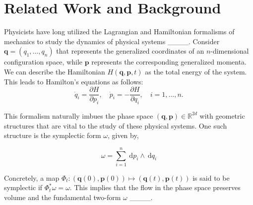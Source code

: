 \section{Related Work and Background}
\label{relatedwork}

Physicists have long utilized the Lagrangian and Hamiltonian formalisms of mechanics to study the dynamics of physical systems ____. Consider $\mathbf q=\left(q_1, \ldots, q_n\right)$ that represents the generalized coordinates of an $n$-dimensional configuration space, while ${\mathbf p}$ represents the corresponding generalized momenta. We can describe the Hamiltonian $H(\mathbf q, \mathbf p, t)$ as the total energy of the system. This leads to Hamilton's equations as follows:
\begin{equation}
    \dot{q}_i=\frac{\partial H}{\partial p_i}, \quad \dot{p}_i=-\frac{\partial H}{\partial q_i}, \quad i=1, \ldots, n.
\end{equation}

This formalism naturally imbues the phase space $(\mathbf q, \mathbf p) \in \mathbb{R}^{2 d}$ with geometric structures that are vital to the study of these physical systems. One such structure is the symplectic form $\omega$, given by,

\begin{equation}
    \omega=\sum_{i=1}^n \mathrm{~d} p_i \wedge \mathrm{~d} q_i
\end{equation}

Concretely, a map $\Phi_t:(\mathbf q(0), \mathbf p(0)) \mapsto(\mathbf q(t), \mathbf p(t))$ is said to be symplectic if $\Phi_t^* \omega=\omega$. This implies that the flow in the phase space preserves volume and the fundamental two-form $\omega$ ____. 

